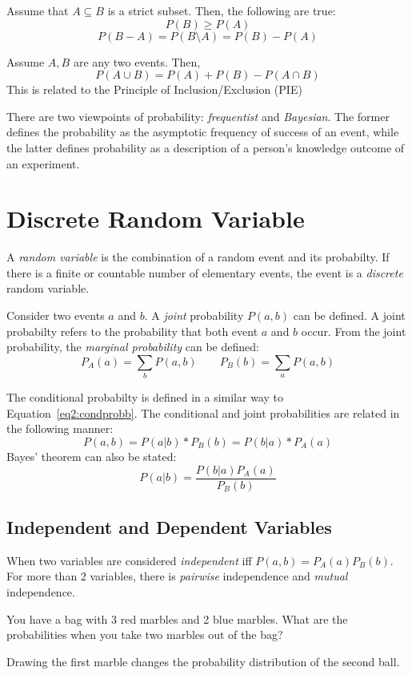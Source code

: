 Assume that \(A\subseteq B\) is a strict subset. Then, the following are true:
\[P(B)\ge P(A)\]
\[P(B-A)=P(B\setminus A)=P(B)-P(A)\]

Assume \(A,B\) are any two events. Then,
\[P(A\cup B)=P(A)+P(B)-P(A\cap B)\]
This is related to the Principle of Inclusion/Exclusion (PIE)

There are two viewpoints of probability: \emph{frequentist} and \emph{Bayesian}. The former defines the probability as the asymptotic frequency of success of an event, while the latter defines probability as a description of a person's knowledge outcome of an experiment.

\section{Discrete Random Variable}
A \emph{random variable} is the combination of a random event and its probabilty. If there is a finite or countable number of elementary events, the event is a \emph{discrete} random variable. 

Consider two events \(a\) and \(b\). A \emph{joint} probability \(P(a,b)\) can be defined. A joint probabilty refers to the probability that both event \(a\) and \(b\) occur. From the joint probability, the \emph{marginal probability} can be defined:
\[P_A(a)=\sum_b P(a,b)\qquad P_B(b)=\sum_a P(a,b)\]

The conditional probabilty is defined in a similar way to Equation~\ref{eq2:condprobb}. The conditional and joint probabilities are related in the following manner:
\[P(a,b)=P(a|b)*P_B(b)=P(b|a)*P_A(a)\]
Bayes' theorem can also be stated:
\begin{equation}
	P(a|b)=\frac{P(b|a)P_A(a)}{P_B(b)}\label{eq2:Bayes}
\end{equation}

\subsection{Independent and Dependent Variables}
When two variables are considered \emph{independent} iff \(P(a,b)=P_A(a)P_B(b)\). For more than 2 variables, there is \emph{pairwise} independence and \emph{mutual} independence.

\begin{aside}
	You have a bag with 3 red marbles and 2 blue marbles. What are the probabilities when you take two marbles out of the bag?

	Drawing the first marble changes the probability distribution of the second ball.	
\end{aside}

